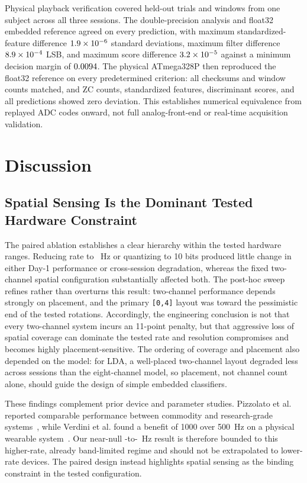 \documentclass[preprint,12pt]{elsarticle}
\begin{document}
Physical playback verification covered \nVerifyTrials{} held-out trials and \nVerifyWindows{} windows from one subject across all three sessions. The double-precision analysis and float32 embedded reference agreed on every prediction, with maximum standardized-feature difference $1.9 \times 10^{-6}$ standard deviations, maximum filter difference $8.9 \times 10^{-4}$ LSB, and maximum score difference $3.2 \times 10^{-5}$ against a minimum decision margin of $0.0094$. The physical ATmega328P then reproduced the float32 reference on every predetermined criterion: all checksums and window counts matched, and ZC counts, standardized features, discriminant scores, and all \nVerifyWindows{} predictions showed zero deviation. This establishes numerical equivalence from replayed ADC codes onward, not full analog-front-end or real-time acquisition validation.

\FloatBarrier
\section{Discussion}

\subsection{Spatial Sensing Is the Dominant Tested Hardware Constraint}
The paired ablation establishes a clear hierarchy within the tested hardware ranges. Reducing rate to \fsCommodity{}~Hz or quantizing to 10 bits produced little change in either Day-1 performance or cross-session degradation, whereas the fixed two-channel spatial configuration substantially affected both. The post-hoc sweep refines rather than overturns this result: two-channel performance depends strongly on placement, and the primary \texttt{[0,4]} layout was toward the pessimistic end of the tested rotations. Accordingly, the engineering conclusion is not that every two-channel system incurs an 11-point penalty, but that aggressive loss of spatial coverage can dominate the tested rate and resolution compromises and becomes highly placement-sensitive. The ordering of coverage and placement also depended on the model: for LDA, a well-placed two-channel layout degraded less across sessions than the eight-channel model, so placement, not channel count alone, should guide the design of simple embedded classifiers.

These findings complement prior device and parameter studies. Pizzolato et al. reported comparable performance between commodity and research-grade systems~\cite{Pizzolato2017-zd}, while Verdini et al. found a benefit of 1000 over 500~Hz on a physical wearable system~\cite{verdini2026sampling}. Our near-null \fsClinical{}-to-\fsCommodity{}~Hz result is therefore bounded to this higher-rate, already band-limited regime and should not be extrapolated to lower-rate devices. The paired design instead highlights spatial sensing as the binding constraint in the tested configuration.
\end{document}
